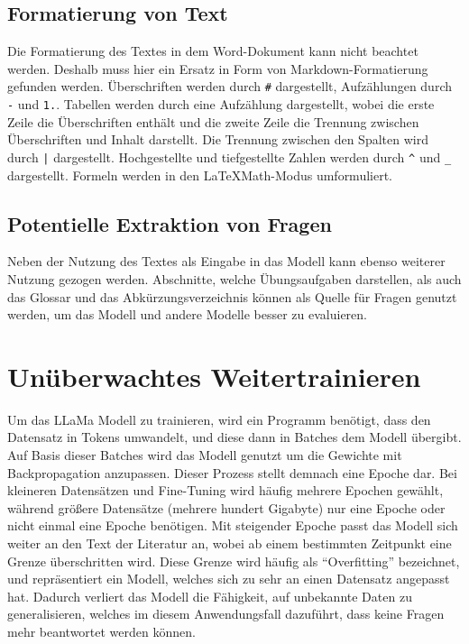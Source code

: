 \subsection{Formatierung von Text}
Die Formatierung des Textes in dem Word-Dokument kann nicht beachtet werden.
Deshalb muss hier ein Ersatz in Form von Markdown-Formatierung gefunden werden.
Überschriften werden durch \texttt{\#} dargestellt, Aufzählungen durch \texttt{-} und \texttt{1.}.
Tabellen werden durch eine Aufzählung dargestellt, wobei die erste Zeile die Überschriften enthält und die zweite Zeile die Trennung zwischen Überschriften und Inhalt darstellt.
Die Trennung zwischen den Spalten wird durch \texttt{|} dargestellt.
Hochgestellte und tiefgestellte Zahlen werden durch \texttt{\^} und \texttt{\_} dargestellt.
Formeln werden in den \LaTeX Math-Modus umformuliert.

\subsection{Potentielle Extraktion von Fragen}
Neben der Nutzung des Textes als Eingabe in das Modell kann ebenso weiterer Nutzung gezogen werden.
Abschnitte, welche Übungsaufgaben darstellen, als auch das Glossar und das Abkürzungsverzeichnis können als Quelle für Fragen genutzt werden,
um das Modell und andere Modelle besser zu evaluieren.

\section{Unüberwachtes Weitertrainieren}
Um das LLaMa Modell zu trainieren, wird ein Programm benötigt, dass den Datensatz in Tokens umwandelt, und diese dann in Batches dem Modell übergibt.
Auf Basis dieser Batches wird das Modell genutzt um die Gewichte mit Backpropagation anzupassen.
Dieser Prozess stellt demnach eine Epoche dar.
Bei kleineren Datensätzen und Fine-Tuning wird häufig mehrere Epochen gewählt, während größere Datensätze (mehrere hundert Gigabyte) nur eine Epoche oder nicht einmal eine Epoche benötigen.
Mit steigender Epoche passt das Modell sich weiter an den Text der Literatur an, wobei ab einem bestimmten Zeitpunkt eine Grenze überschritten wird.
Diese Grenze wird häufig als \enquote{Overfitting} bezeichnet, und repräsentiert ein Modell, welches sich zu sehr an einen Datensatz angepasst hat.
Dadurch verliert das Modell die Fähigkeit, auf unbekannte Daten zu generalisieren, welches im diesem Anwendungsfall dazuführt, dass keine Fragen mehr beantwortet werden können.\\

